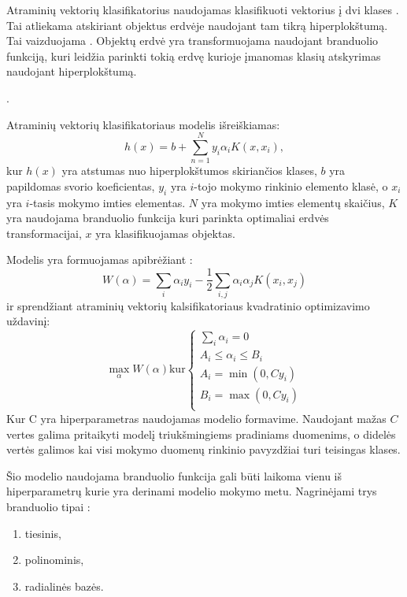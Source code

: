 Atraminių vektorių klasifikatorius naudojamas klasifikuoti vektorius į dvi klases \cite{comp}. Tai atliekama atskiriant objektus erdvėje naudojant tam tikrą hiperplokštumą. Tai vaizduojama . Objektų erdvė yra transformuojama naudojant branduolio funkciją, kuri leidžia parinkti tokią erdvę kurioje įmanomas klasių atskyrimas naudojant hiperplokštumą.

.

Atraminių vektorių klasifikatoriaus modelis išreiškiamas\cite{comp}:
\begin{equation}
    h(x) = b + \sum_{n=1}^{N}y_i \alpha_i K(x, x_i),
\end{equation}
kur $h(x)$ yra atstumas nuo hiperplokštumos skiriančios klases, $b$ yra papildomas svorio koeficientas, $y_i$ yra $i$-tojo mokymo rinkinio elemento klasė, o $x_i$ yra $i$-tasis mokymo imties elementas. $N$ yra mokymo imties elementų skaičius, $K$ yra naudojama branduolio funkcija kuri parinkta optimaliai erdvės transformacijai, $x$ yra klasifikuojamas objektas.

Modelis yra formuojamas apibrėžiant \cite{ksvm}:
\begin{equation}
    W(\alpha) = \sum_{i}\alpha_i y_i - \frac{1}{2} \sum_{i, j} \alpha_i \alpha_j K(x_i, x_j)
\end{equation}
ir sprendžiant atraminių vektorių kalsifikatoriaus kvadratinio optimizavimo uždavinį:
\begin{equation}
\max_{\alpha} W(\alpha) \text{kur} \left\{
                  \begin{array}{l}
                    \sum_{i} \alpha_i = 0 \\
                    A_i \leq \alpha_i \leq B_i \\
                    A_i = \min(0, Cy_i) \\
                    B_i = \max(0, Cy_i) \\
                  \end{array}
                \right.
\end{equation}
Kur C yra hiperparametras naudojamas modelio formavime. Naudojant mažas $C$ vertes galima pritaikyti modelį triukšmingiems pradiniams duomenims, o didelės vertės galimos kai visi mokymo duomenų rinkinio pavyzdžiai turi teisingas klases.

Šio modelio naudojama branduolio funkcija gali būti laikoma vienu iš hiperparametrų kurie yra derinami modelio mokymo metu. Nagrinėjami trys branduolio tipai \cite{vw}:
\begin{enumerate}
    \item tiesinis,
    \item polinominis,
    \item radialinės bazės.
\end{enumerate}

